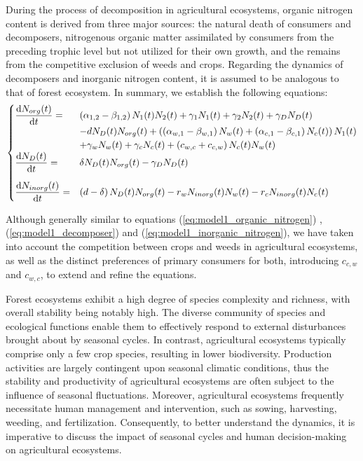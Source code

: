 \documentclass{mcmthesis}
\begin{document}
During the process of decomposition in agricultural ecosystems, organic nitrogen content is derived from three major sources: the natural death of consumers and decomposers, nitrogenous organic matter assimilated by consumers from the preceding trophic level but not utilized for their own growth, and the remains from the competitive exclusion of weeds and crops. Regarding the dynamics of decomposers and inorganic nitrogen content, it is assumed to be analogous to that of  forest ecosystem. In summary, we establish the following equations:
\begin{align}
\label{eq:model2_environment}
\begin{cases}
    \displaystyle \frac{\mathrm{d}N_{org}(t)}{\mathrm{d}t} 
   =  &\left( \alpha _{1,2} - \beta _{1,2} \right) N_1(t) N_2(t) + \gamma_1 N_1(t) + \gamma_2 N_2(t) + \gamma_D N_D(t) \\
   & - d N_D(t) N_{org}(t) 
     + \left( \left( \alpha_{w,1} - \beta_{w,1} \right) N_w(t) + \left( \alpha_{c,1} - \beta_{c,1} \right) N_c(t) \right) N_1(t) \\
    & + \gamma_w N_w(t) + \gamma_c N_c(t) + \left( c_{w,c} + c_{c,w} \right) N_c(t) N_w(t) \\
    \vspace{10pt} 
    \displaystyle \frac{\mathrm{d}N_D(t)}{\mathrm{d}t} 
    =  &\delta N_D(t) N_{org}(t) - \gamma_D N_D(t) \\
    \displaystyle \frac{\mathrm{d}N_{inorg}(t)}{\mathrm{d}t}
    =  &\left( d - \delta \right) N_D(t) N_{org}(t) - r_w N_{inorg}(t) N_w(t) - r_c N_{inorg}(t) N_c(t)
\end{cases}
\end{align}

Although generally similar to equations (\ref{eq:model1_organic_nitrogen}) ,(\ref{eq:model1_decomposer}) and (\ref{eq:model1_inorganic_nitrogen}), we have taken into account the competition between crops and weeds in agricultural ecosystems, as well as the distinct preferences of primary consumers for both, introducing $c_{c,w}$ and $c_{w,c}$, to extend and refine the equations.

Forest ecosystems exhibit a high degree of species complexity and richness, with overall stability being notably high. The diverse community of species and ecological functions enable them to effectively respond to external disturbances brought about by seasonal cycles. In contrast, agricultural ecosystems typically comprise only a few crop species, resulting in lower biodiversity. Production activities are largely contingent upon seasonal climatic conditions, thus the stability and productivity of agricultural ecosystems are often subject to the influence of seasonal fluctuations. Moreover, agricultural ecosystems frequently necessitate human management and intervention, such as sowing, harvesting, weeding, and fertilization. Consequently, to better understand the dynamics, it is imperative to discuss the impact of seasonal cycles and human decision-making on agricultural ecosystems.
\end{document}
